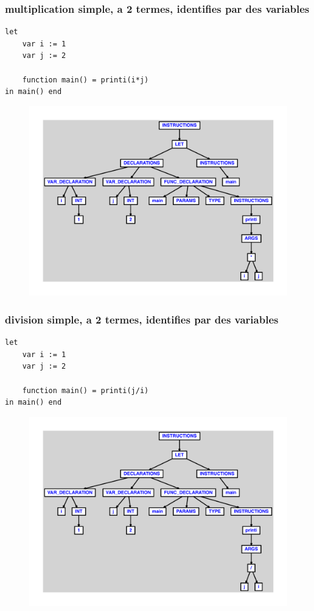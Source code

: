 \documentclass{article}
\begin{document}
\subsubsection{multiplication simple, a 2 termes, identifies par des variables}
\begin{lstlisting}
let
	var i := 1
	var j := 2

	function main() = printi(i*j)
in main() end
\end{lstlisting}
\newpage
\begin{figure}[H]
\centering
\includegraphics[max width=\textwidth]{ast/ast_53.pdf}
\end{figure}
\newpage
\subsubsection{division simple, a 2 termes, identifies par des variables}
\begin{lstlisting}
let
	var i := 1
	var j := 2

	function main() = printi(j/i)
in main() end
\end{lstlisting}
\newpage
\begin{figure}[H]
\centering
\includegraphics[max width=\textwidth]{ast/ast_54.pdf}
\end{figure}
\newpage
\end{document}
